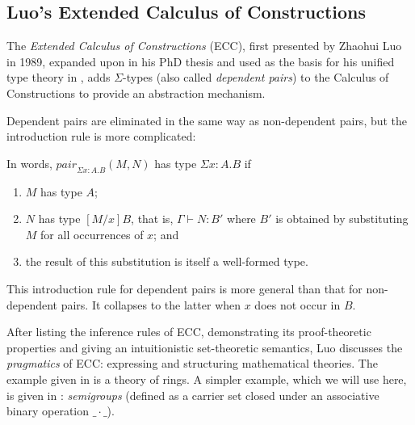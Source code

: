 \documentclass[12pt,toc=bibliography,numbers=noendperiod,
               footnotes=multiple,twoside]{scrartcl}
\begin{document}
\subsection{Luo's Extended Calculus of Constructions}

The \emph{Extended Calculus of Constructions} (ECC), first presented by Zhaohui Luo in 1989\autocite{luo_ecc_1989}, expanded upon in his PhD thesis\autocite{luo_extended_1990} and used as the basis for his unified type theory in \autocite{luo_computation_1994}, adds \(\Sigma\)-types (also called \emph{dependent pairs}) to the Calculus of Constructions to provide an abstraction mechanism.

Dependent pairs are eliminated in the same way as non-dependent pairs, but the introduction rule is more complicated:

\begin{prooftree}
\end{prooftree}

In words, \(\textit{pair}_{\Sigma x:A.B} (M,N)\) has type \(\Sigma x:A.B\) if

\begin{enumerate}
\item \(M\) has type \(A\);
\item \(N\) has type \([M/x] B\), that is, \(\Gamma \vdash N:B'\) where \(B'\) is obtained by substituting \(M\) for all occurrences of \(x\); and
\item the result of this substitution is itself a well-formed type.
\end{enumerate}

This introduction rule for dependent pairs is more general than that for non-dependent pairs. It collapses to the latter when \(x\) does not occur in \(B\).

After listing the inference rules of ECC, demonstrating its proof-theoretic properties and giving an intuitionistic set-theoretic semantics, Luo discusses the \textit{pragmatics} of ECC: expressing and structuring mathematical theories. The example given in \textcite{luo_ecc_1989} is a theory of rings. A simpler example, which we will use here, is given in \textcite{luo_extended_1990}: \emph{semigroups} (defined as a carrier set closed under an associative binary operation \(\_\cdot\_\)).
\end{document}
